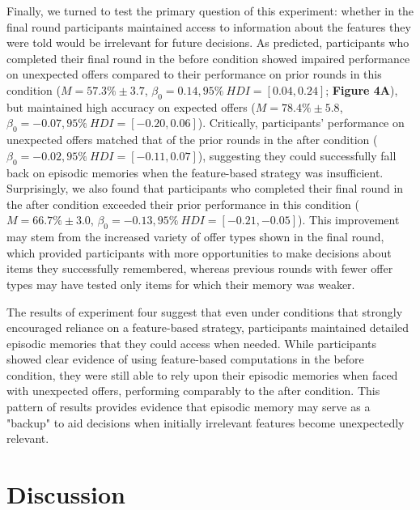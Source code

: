 \documentclass[10pt,letterpaper]{article}
\begin{document}
Finally, we turned to test the primary question of this experiment: whether in the final round participants maintained access to information about the features they were told would be irrelevant for future decisions. As predicted, participants who completed their final round in the before condition showed impaired performance on unexpected offers compared to their performance on prior rounds in this condition ($M = 57.3\% \pm 3.7$, $\beta_{0} = 0.14, 95\% \ HDI = [0.04, 0.24]$; \textbf{Figure 4A}), but maintained high accuracy on expected offers ($M = 78.4\% \pm 5.8$, $\beta_{0} = -0.07, 95\% \ HDI = [-0.20, 0.06]$). Critically, participants' performance on unexpected offers matched that of the prior rounds in the after condition ($\beta_{0} = -0.02, 95\% \ HDI = [-0.11, 0.07]$), suggesting they could successfully fall back on episodic memories when the feature-based strategy was insufficient. Surprisingly, we also found that participants who completed their final round in the after condition exceeded their prior performance in this condition ($M = 66.7\% \pm 3.0$, $\beta_{0} = -0.13,  95\% \ HDI = [-0.21, -0.05]$). This improvement may stem from the increased variety of offer types shown in the final round, which provided participants with more opportunities to make decisions about items they successfully remembered, whereas previous rounds with fewer offer types may have tested only items for which their memory was weaker.

The results of experiment four suggest that even under conditions that strongly encouraged reliance on a feature-based strategy, participants maintained detailed episodic memories that they could access when needed. While participants showed clear evidence of using feature-based computations in the before condition, they were still able to rely upon their episodic memories when faced with unexpected offers, performing comparably to the after condition. This pattern of results provides evidence that episodic memory may serve as a "backup" to aid decisions when initially irrelevant features become unexpectedly relevant.

\section{Discussion}
\end{document}
